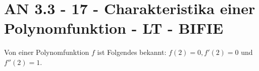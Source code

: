 \section{AN 3.3 - 17 - Charakteristika einer Polynomfunktion - LT - BIFIE}

\begin{beispiel}[AN 3.3]{1} %
				Von einer Polynomfunktion $f$ ist Folgendes bekannt: $f(2)=0,f'(2)=0$ und $f''(2)=1$.
				
\end{beispiel}